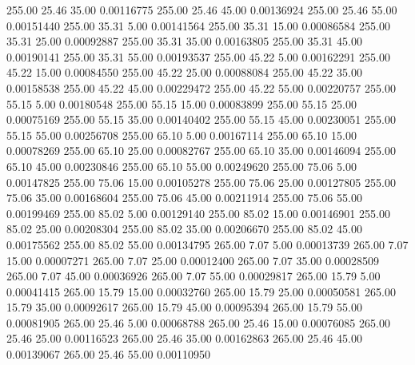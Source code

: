     255.00     25.46     35.00     0.00116775
    255.00     25.46     45.00     0.00136924
    255.00     25.46     55.00     0.00151440
    255.00     35.31      5.00     0.00141564
    255.00     35.31     15.00     0.00086584
    255.00     35.31     25.00     0.00092887
    255.00     35.31     35.00     0.00163805
    255.00     35.31     45.00     0.00190141
    255.00     35.31     55.00     0.00193537
    255.00     45.22      5.00     0.00162291
    255.00     45.22     15.00     0.00084550
    255.00     45.22     25.00     0.00088084
    255.00     45.22     35.00     0.00158538
    255.00     45.22     45.00     0.00229472
    255.00     45.22     55.00     0.00220757
    255.00     55.15      5.00     0.00180548
    255.00     55.15     15.00     0.00083899
    255.00     55.15     25.00     0.00075169
    255.00     55.15     35.00     0.00140402
    255.00     55.15     45.00     0.00230051
    255.00     55.15     55.00     0.00256708
    255.00     65.10      5.00     0.00167114
    255.00     65.10     15.00     0.00078269
    255.00     65.10     25.00     0.00082767
    255.00     65.10     35.00     0.00146094
    255.00     65.10     45.00     0.00230846
    255.00     65.10     55.00     0.00249620
    255.00     75.06      5.00     0.00147825
    255.00     75.06     15.00     0.00105278
    255.00     75.06     25.00     0.00127805
    255.00     75.06     35.00     0.00168604
    255.00     75.06     45.00     0.00211914
    255.00     75.06     55.00     0.00199469
    255.00     85.02      5.00     0.00129140
    255.00     85.02     15.00     0.00146901
    255.00     85.02     25.00     0.00208304
    255.00     85.02     35.00     0.00206670
    255.00     85.02     45.00     0.00175562
    255.00     85.02     55.00     0.00134795
    265.00      7.07      5.00     0.00013739
    265.00      7.07     15.00     0.00007271
    265.00      7.07     25.00     0.00012400
    265.00      7.07     35.00     0.00028509
    265.00      7.07     45.00     0.00036926
    265.00      7.07     55.00     0.00029817
    265.00     15.79      5.00     0.00041415
    265.00     15.79     15.00     0.00032760
    265.00     15.79     25.00     0.00050581
    265.00     15.79     35.00     0.00092617
    265.00     15.79     45.00     0.00095394
    265.00     15.79     55.00     0.00081905
    265.00     25.46      5.00     0.00068788
    265.00     25.46     15.00     0.00076085
    265.00     25.46     25.00     0.00116523
    265.00     25.46     35.00     0.00162863
    265.00     25.46     45.00     0.00139067
    265.00     25.46     55.00     0.00110950
